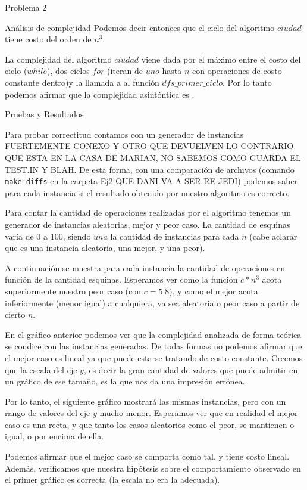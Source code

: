 \begin{section}{Problema 2}
\begin{subsection}{Análisis de complejidad}
		Podemos decir entonces que el ciclo del algoritmo $ciudad$ tiene costo del orden de $n^3$.

		La complejidad del algoritmo $ciudad$ viene dada por el máximo entre el costo del ciclo ($while$), dos ciclos $for$ (iteran de $uno$ hasta $n$ con operaciones de costo constante dentro)y la llamada a al función $dfs\_primer\_ciclo$. Por lo tanto podemos afirmar que la complejidad asintóntica es .
	\end{subsection}

	\begin{subsection}{Pruebas y Resultados}
	
	Para probar correctitud contamos con un generador de instancias FUERTEMENTE CONEXO Y OTRO QUE DEVUELVEN LO CONTRARIO QUE ESTA EN LA CASA DE MARIAN, NO SABEMOS COMO GUARDA EL TEST.IN Y BLAH. De esta forma, con una comparación de archivos (comando \texttt{make diffs} en la carpeta Ej2 QUE DANI VA A SER RE JEDI) podemos saber para cada instancia si el resultado obtenido por nuestro algoritmo es correcto.

	Para contar la cantidad de operaciones realizadas por el algoritmo tenemos un generador de instancias aleatorias, mejor y peor caso. La cantidad de esquinas varía de $0$ a $100$, siendo $una$ la cantidad de instancias para cada $n$ (cabe aclarar que es una instancia aleatoria, una mejor, y una peor).

	A continuación se muestra para cada instancia la cantidad de operaciones en función de la cantidad esquinas. Esperamos ver como la función $c*n^3$ acota superiormente nuestro peor caso (con $c=5.8$), y como el mejor acota inferiormente (menor igual) a cualquiera, ya sea aleatoria o peor caso a partir de cierto $n$.


	En el gráfico anterior podemos ver que la complejidad analizada de forma teórica se condice con las instancias generadas. De todas formas no podemos afirmar que el mejor caso es lineal ya que puede estarse tratando de costo constante. Creemos que la escala del eje $y$, es decir la gran cantidad de valores que puede admitir en un gráfico de ese tamaño, es la que nos da una impresión errónea.

	Por lo tanto, el siguiente gráfico mostrará las mismas instancias, pero con un rango de valores del eje $y$ mucho menor. Esperamos ver que en realidad el mejor caso es una recta, y que tanto los casos aleatorios como el peor, se mantienen o igual, o por encima de ella.


	Podemos afirmar que el mejor caso se comporta como tal, y tiene costo lineal. Además, verificamos que nuestra hipótesis sobre el comportamiento observado en el primer gráfico es correcta (la escala no era la adecuada).

	\end{subsection}

\end{section}

